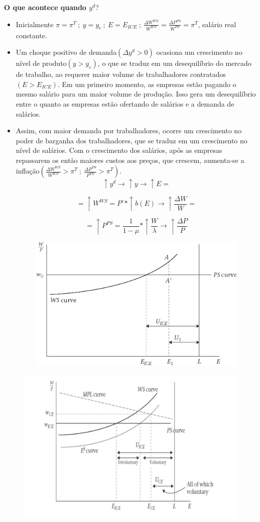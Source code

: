 \documentclass[a4paper,12pt]{article}[abntex2]
\begin{document}
\textbf{O que acontece quando \(y^d\)}?\begin{itemize}
    \item Inicialmente \(\pi=\pi^T \ ; \ y=y_e \ ; \ E=E_{ICE} \ ; \ \frac{\Delta W^{WS}}{W^{WS}}=\frac{\Delta P^{PS}}{W^{PS}}=\pi^T\), salário real constante.
    \item Um choque positivo de demanda\((\Delta y^d>0)\) ocasiona um crescimento no nível de produto\((y>y_e)\), o que se traduz em um desequilíbrio do mercado de trabalho, ao requerer maior volume de trabalhadores contratados\((E>E_{ICE})\). Em um primeiro momento, as empresas estão pagando o mesmo salário para um maior volume de produção. Isso gera um desequilíbrio entre o quanto as empresas estão ofertando de salários e a demanda de salários. 
    \item Assim, com maior demanda por trabalhadores, ocorre um crescimento no poder de barganha dos trabalhadores, que se traduz em um crescimento no nível de salários. Com o crescimento dos salários, após as empresas repassarem os então maiores custos aos preços, que crescem, aumenta-se a inflação\((\frac{\Delta W^{WS}}{W^{WS}}>\pi^T \ ; \ \frac{\Delta P^{PS}}{P^{PS}}>\pi^T)\). 
    \[
    \uparrow y^d \rightarrow \uparrow y \rightarrow \uparrow E =
    \]
    
    \[
    = \uparrow W^{WS} = P^e * \uparrow b(E) \rightarrow \uparrow \frac{\Delta W}{W} =
    \]
    
    \[
    = \uparrow P^{PS} = \frac{1}{1 - \mu} * \uparrow \frac{W}{\lambda} \rightarrow \uparrow \frac{\Delta P}{P}
    \]

    \begin{figure}[H]
    \centering
    \includegraphics[width=0.7\linewidth]{Imagens/a7i1.png}
    \end{figure}

\end{itemize}

\begin{figure}[H]
    \centering
    \includegraphics[width=0.7\linewidth]{Imagens/a7i2.png}
\end{figure}
\end{document}
